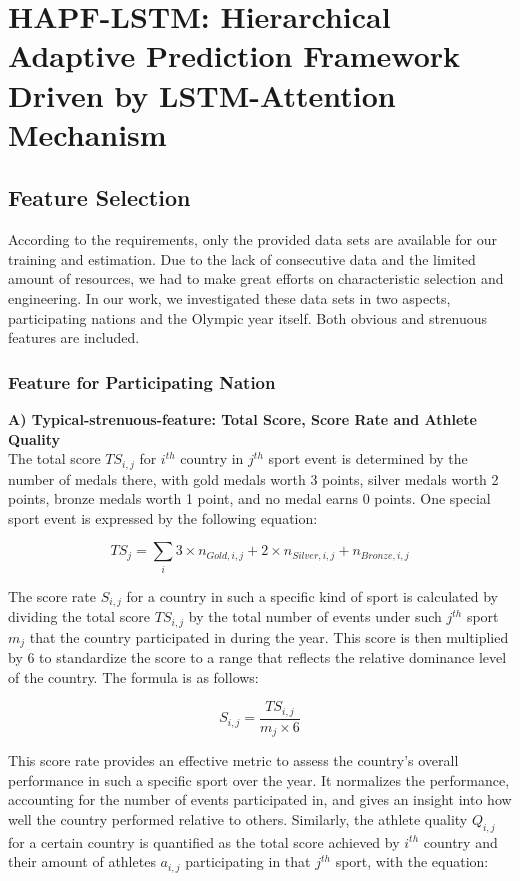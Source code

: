 \documentclass[12pt]{article}
\begin{document}
\section{HAPF-LSTM: Hierarchical Adaptive Prediction Framework Driven by LSTM-Attention Mechanism}
\subsection{Feature Selection}
\quad \quad According to the requirements, only the provided data sets are available for our training and estimation. Due to the lack of consecutive data and the limited amount of resources, we had to make great efforts on characteristic selection and engineering. In our work, we investigated these data sets in two aspects, participating nations and the Olympic year itself. Both obvious and strenuous features are included.

\subsubsection{Feature for Participating Nation}
\textbf{A) Typical-strenuous-feature: Total Score, Score Rate and Athlete Quality}\\

The total score \(TS_{i,j}\) for \(i^{th} \) country in \(j^{th} \) sport event is determined by the number of medals there, with gold medals worth 3 points, silver medals worth 2 points, bronze medals worth 1 point, and no medal earns 0 points. One special sport event is expressed by the following equation:

\begin{equation}\label{eq2}
TS_j = \sum\limits_{i} 3 \times n_{Gold,i,j} + 2 \times n_{Silver,i,j} + n_{Bronze,i,j}
\end{equation}

The score rate \(S_{i,j}\) for a country in such a specific kind of sport is calculated by dividing the total score \(TS_{i,j}\) by the total number of events under such \(j^{th} \) sport \(m_j\) that the country participated in during the year. This score is then multiplied by 6 to standardize the score to a range that reflects the relative dominance level of the country. The formula is as follows:

\begin{equation}\label{eq3}
    S_{i,j} = \frac{TS_{i,j}}{m_j \times 6}
\end{equation}

This score rate provides an effective metric to assess the country's overall performance in such a specific sport over the year. It normalizes the performance, accounting for the number of events participated in, and gives an insight into how well the country performed relative to others. Similarly, the athlete quality $ Q_{i,j} $ for a certain country is quantified as the total score achieved by \(i^{th} \) country and their amount of athletes $ a_{i,j} $ participating in that \(j^{th} \) sport, with the equation:
\end{document}
